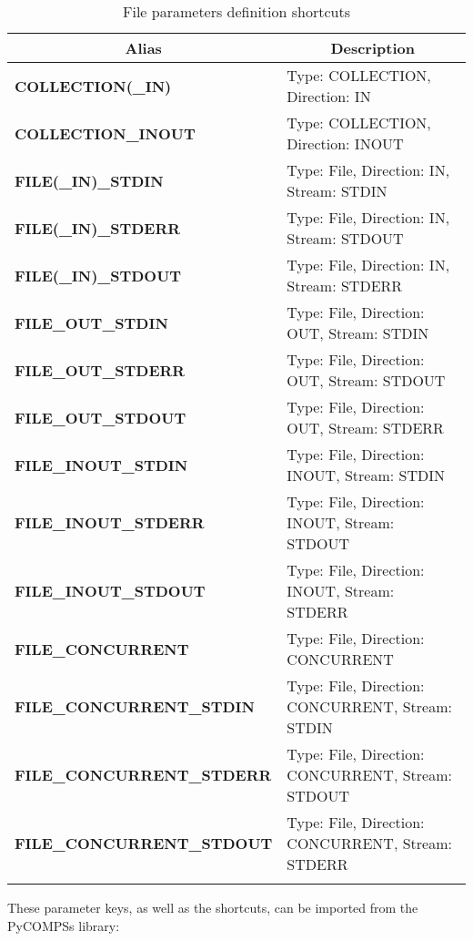 \bgroup
  \def\arraystretch{1.5}%
  \begin{longtable}{| p{} | p{} |}
    \hline
    \multicolumn{1}{|c|}{{\bf Alias }} &  \multicolumn{1}{c|}{{\bf Description }}\\
    \hline
        \multirow{1}{*}{{\bf COLLECTION(\_IN)}}  & Type: COLLECTION, Direction: IN \\
        \multirow{1}{*}{{\bf COLLECTION\_INOUT}}  & Type: COLLECTION, Direction: INOUT \\
        \multirow{1}{*}{{\bf FILE(\_IN)\_STDIN}}  & Type: File, Direction: IN, Stream: STDIN \\
        \multirow{1}{*}{{\bf FILE(\_IN)\_STDERR}} & Type: File, Direction: IN, Stream: STDOUT \\
        \multirow{1}{*}{{\bf FILE(\_IN)\_STDOUT}} & Type: File, Direction: IN, Stream: STDERR \\
        \multirow{1}{*}{{\bf FILE\_OUT\_STDIN}}  & Type: File, Direction: OUT, Stream: STDIN \\
        \multirow{1}{*}{{\bf FILE\_OUT\_STDERR}} & Type: File, Direction: OUT, Stream: STDOUT \\
        \multirow{1}{*}{{\bf FILE\_OUT\_STDOUT}} & Type: File, Direction: OUT, Stream: STDERR \\
        \multirow{1}{*}{{\bf FILE\_INOUT\_STDIN}}  & Type: File, Direction: INOUT, Stream: STDIN \\
        \multirow{1}{*}{{\bf FILE\_INOUT\_STDERR}} & Type: File, Direction: INOUT, Stream: STDOUT \\
        \multirow{1}{*}{{\bf FILE\_INOUT\_STDOUT}} & Type: File, Direction: INOUT, Stream: STDERR \\
        \multirow{1}{*}{{\bf FILE\_CONCURRENT}}  & Type: File, Direction: CONCURRENT \\
        \multirow{1}{*}{{\bf FILE\_CONCURRENT\_STDIN}}  & Type: File, Direction: CONCURRENT, Stream: STDIN \\
        \multirow{1}{*}{{\bf FILE\_CONCURRENT\_STDERR}} & Type: File, Direction: CONCURRENT, Stream: STDOUT \\
        \multirow{1}{*}{{\bf FILE\_CONCURRENT\_STDOUT}} & Type: File, Direction: CONCURRENT, Stream: STDERR \\
    \hline
     \caption{File parameters definition shortcuts}
    \label{tab:other_parameters_shortcuts}
  \end{longtable}
\egroup

These parameter keys, as well as the shortcuts, can be imported from the PyCOMPSs library:

